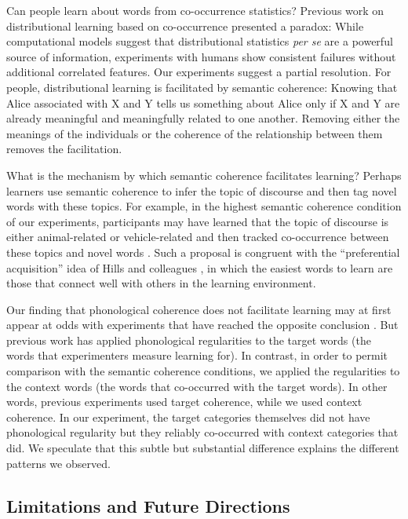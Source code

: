 \documentclass[man,floatsintext]{apa6}
\begin{document}
Can people learn about words from co-occurrence statistics? Previous work on distributional learning based on co-occurrence presented a paradox: While computational models suggest that distributional statistics \emph{per se} are a powerful source of information, experiments with humans show consistent failures without additional correlated features. Our experiments suggest a partial resolution. For people, distributional learning is facilitated by semantic coherence: Knowing that Alice associated with X and Y tells us something about Alice only if X and Y are already meaningful and meaningfully related to one another. Removing either the meanings of the individuals or the coherence of the relationship between them removes the facilitation.

What is the mechanism by which semantic coherence facilitates learning? Perhaps learners use semantic coherence to infer the topic of discourse and then tag novel words with these topics. For example, in the highest semantic coherence condition of our experiments, participants may have learned that the topic of discourse is either animal-related or vehicle-related and then tracked co-occurrence between these topics and novel words \citep{frank2013}. Such a proposal is congruent with the ``preferential acquisition'' idea of Hills and colleagues \citeyearpar{hills2009, hills2010}, in which the easiest words to learn are those that connect well with others in the learning environment.

Our finding that phonological coherence does not facilitate learning may at first appear at odds with experiments that have reached the opposite conclusion \citep{frigo1998, lany2010, monaghan2005}. But previous work has applied phonological regularities to the target words (the words that experimenters measure learning for).  In contrast, in order to permit comparison with the semantic coherence conditions, we applied the regularities to the context words (the words that co-occurred with the target words). In other words, previous experiments used target coherence, while we used context coherence. In our experiment, the target categories themselves did not have phonological regularity but they reliably co-occurred with context categories that did. We speculate that this subtle but substantial difference explains the different patterns we observed.

\subsection{Limitations and Future Directions}
\end{document}
